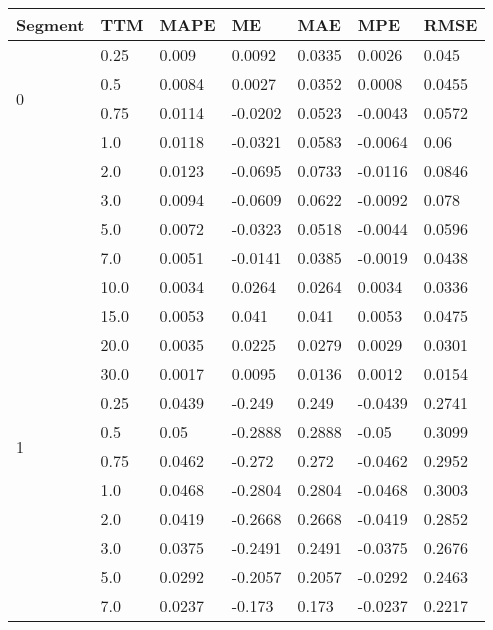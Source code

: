     \begin{table}[htbp]
        \centering
        \begin{tabular}{|l|l|l|l|l|l|l|}
        \hline
        Segment            & TTM    & MAPE       & ME       & MAE     & MPE         & RMSE    \\ \hline
        \multirow{4}{*}{0}&0.25&0.009&0.0092&0.0335&0.0026&0.045\\ \cline{2-7}
                        &0.5&0.0084&0.0027&0.0352&0.0008&0.0455\\ \cline{2-7}
                        &0.75&0.0114&-0.0202&0.0523&-0.0043&0.0572\\ \cline{2-7}
                        &1.0&0.0118&-0.0321&0.0583&-0.0064&0.06\\ \cline{2-7}
                        &2.0&0.0123&-0.0695&0.0733&-0.0116&0.0846\\ \cline{2-7}
                        &3.0&0.0094&-0.0609&0.0622&-0.0092&0.078\\ \cline{2-7}
                        &5.0&0.0072&-0.0323&0.0518&-0.0044&0.0596\\ \cline{2-7}
                        &7.0&0.0051&-0.0141&0.0385&-0.0019&0.0438\\ \cline{2-7}
                        &10.0&0.0034&0.0264&0.0264&0.0034&0.0336\\ \cline{2-7}
                        &15.0&0.0053&0.041&0.041&0.0053&0.0475\\ \cline{2-7}
                        &20.0&0.0035&0.0225&0.0279&0.0029&0.0301\\ \cline{2-7}
                        &30.0&0.0017&0.0095&0.0136&0.0012&0.0154\\ \hline
        \multirow{4}{*}{1}&0.25&0.0439&-0.249&0.249&-0.0439&0.2741\\ \cline{2-7}
                        &0.5&0.05&-0.2888&0.2888&-0.05&0.3099\\ \cline{2-7}
                        &0.75&0.0462&-0.272&0.272&-0.0462&0.2952\\ \cline{2-7}
                        &1.0&0.0468&-0.2804&0.2804&-0.0468&0.3003\\ \cline{2-7}
                        &2.0&0.0419&-0.2668&0.2668&-0.0419&0.2852\\ \cline{2-7}
                        &3.0&0.0375&-0.2491&0.2491&-0.0375&0.2676\\ \cline{2-7}
                        &5.0&0.0292&-0.2057&0.2057&-0.0292&0.2463\\ \cline{2-7}
                        &7.0&0.0237&-0.173&0.173&-0.0237&0.2217\\ \cline{2-7}

\end{tabular}
\end{table}
